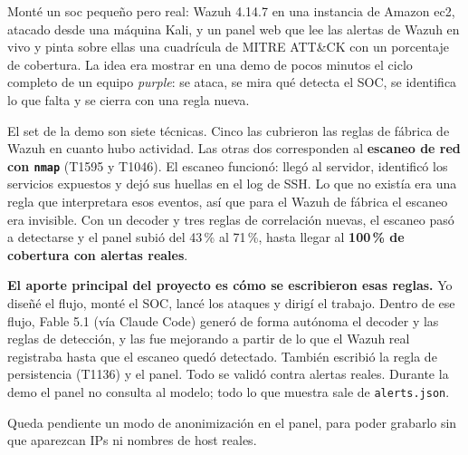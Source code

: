 \documentclass{mapc-proyecto}
\begin{document}
\portada

\begin{resumen}
Monté un \gls{soc} pequeño pero real: Wazuh 4.14.7 en una instancia de Amazon
\gls{ec2}, atacado desde una máquina Kali, y un panel web que lee las alertas de
Wazuh en vivo y pinta sobre ellas una cuadrícula de MITRE ATT\&CK con un porcentaje
de cobertura. La idea era mostrar en una demo de pocos minutos el ciclo completo
de un equipo \emph{purple}: se ataca, se mira qué detecta el SOC, se identifica
lo que falta y se cierra con una regla nueva.

El set de la demo son siete técnicas. Cinco las cubrieron las reglas de fábrica de
Wazuh en cuanto hubo actividad. Las otras dos corresponden al \textbf{escaneo de
red con \texttt{nmap}} (T1595 y T1046). El escaneo funcionó: llegó al servidor,
identificó los servicios expuestos y dejó sus huellas en el log de SSH. Lo que no
existía era una regla que interpretara esos eventos, así que para el Wazuh de
fábrica el escaneo era invisible. Con un decoder y tres reglas de correlación
nuevas, el escaneo pasó a detectarse y el panel subió del 43\,\% al 71\,\%, hasta
llegar al \textbf{100\,\% de cobertura con alertas reales}.

\textbf{El aporte principal del proyecto es cómo se escribieron esas reglas.} Yo
diseñé el flujo, monté el SOC, lancé los ataques y dirigí el trabajo. Dentro de ese
flujo, Fable 5.1 (vía Claude Code) generó de forma autónoma el decoder y las reglas
de detección, y las fue mejorando a partir de lo que el Wazuh real registraba hasta
que el escaneo quedó detectado. También escribió la regla de persistencia (T1136)
y el panel. Todo se validó contra alertas reales. Durante la demo el panel no
consulta al modelo; todo lo que muestra sale de \texttt{alerts.json}.

Queda pendiente un modo de anonimización en el panel, para poder grabarlo sin
que aparezcan IPs ni nombres de host reales.
\end{resumen}

\end{document}
